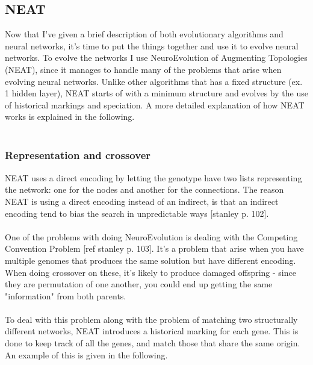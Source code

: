 \subsection{NEAT}
Now that I've given a brief description of both evolutionary algorithms and neural networks, it's time to put the things together and use it to evolve neural networks. To evolve the networks I use NeuroEvolution of Augmenting Topologies (NEAT), since it manages to handle many of the problems that arise when evolving neural networks. Unlike other algorithms that has a fixed structure (ex. 1 hidden layer), NEAT starts of with a minimum structure and evolves by the use of historical markings and speciation. A more detailed explanation of how NEAT works is explained in the following.
\\
\\
\subsubsection{Representation and crossover}
NEAT uses a direct encoding by letting the genotype have two lists representing the network: one for the nodes and another for the connections. The reason NEAT is using a direct encoding instead of an indirect, is that an indirect encoding tend to bias the search in unpredictable ways [stanley p. 102].
\\
\\
One of the problems with doing NeuroEvolution is dealing with the Competing Convention Problem [ref stanley p. 103]. It's a problem that arise when you have multiple genomes that produces the same solution but have different encoding. When doing crossover on these, it's likely to produce damaged offspring - since they are permutation of one another, you could end up getting the same "information" from both parents.
\\
\\
To deal with this problem along with the problem of matching two structurally different networks, NEAT introduces a historical marking for each gene. This is done to keep track of all the genes, and match those that share the same origin. An example of this is given in the following.
